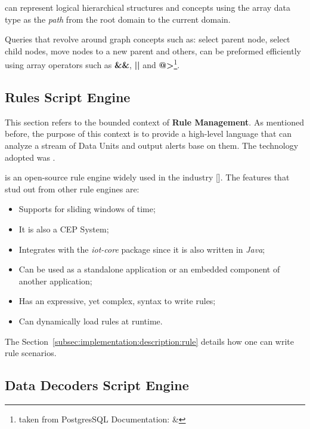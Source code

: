  can represent logical hierarchical structures and concepts using the array data type as the \textit{path} from the root domain to the current domain.

Queries that revolve around graph concepts such as: select parent node, select child nodes, move nodes to a new parent and others, can be preformed efficiently using array operators such as \textbf{\&\&}, \textbf{||} and \textbf{@>}\footnote{taken from PostgresSQL Documentation:  \& }.

\subsection{Rules Script Engine}
\label{subsec:implementation:decisions:drools}

This section refers to the bounded context of \textbf{Rule Management}. As mentioned before, the purpose of this context is to provide a high-level language that can analyze a stream of Data Units and output alerts base on them. The technology adopted was .

 is an open-source rule engine widely used in the industry [\cite{droolsindustry}]. The features that stud out from other rule engines are:

\begin{itemize}
    \item Supports for sliding windows of time;
    \item It is also a \gls{CEP} System;
    \item Integrates with the \textit{iot-core} package since it is also written in \textit{Java};
    \item Can be used as a standalone application or an embedded component of another application;
    \item Has an expressive, yet complex, syntax to write rules;
    \item Can dynamically load rules at runtime.
\end{itemize}

The Section~\ref{subsec:implementation:description:rule} details how one can write rule scenarios.

\subsection{Data Decoders Script Engine}
\label{subsec:implementation:decisions:js}

